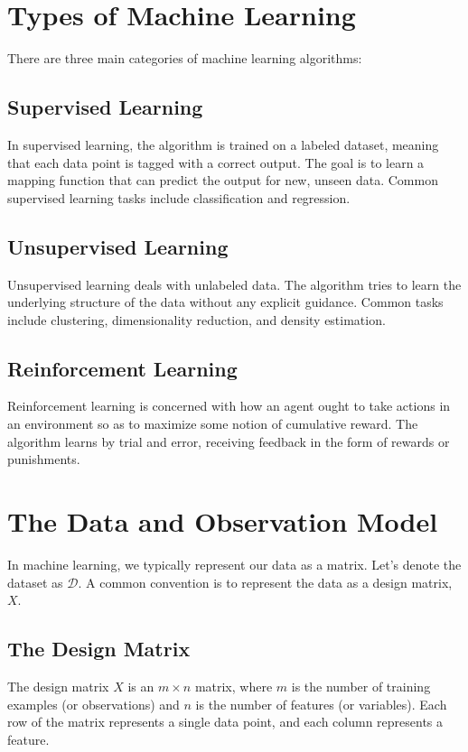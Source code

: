 \section{Types of Machine Learning}
There are three main categories of machine learning algorithms:

\subsection{Supervised Learning}
In supervised learning, the algorithm is trained on a labeled dataset, meaning that each data point is tagged with a correct output. The goal is to learn a mapping function that can predict the output for new, unseen data. Common supervised learning tasks include classification and regression.

\subsection{Unsupervised Learning}
Unsupervised learning deals with unlabeled data. The algorithm tries to learn the underlying structure of the data without any explicit guidance. Common tasks include clustering, dimensionality reduction, and density estimation.

\subsection{Reinforcement Learning}
Reinforcement learning is concerned with how an agent ought to take actions in an environment so as to maximize some notion of cumulative reward. The algorithm learns by trial and error, receiving feedback in the form of rewards or punishments.

\section{The Data and Observation Model}
In machine learning, we typically represent our data as a matrix. Let's denote the dataset as $\mathcal{D}$. A common convention is to represent the data as a design matrix, $X$.

\subsection{The Design Matrix}
The design matrix $X$ is an $m \times n$ matrix, where $m$ is the number of training examples (or observations) and $n$ is the number of features (or variables). Each row of the matrix represents a single data point, and each column represents a feature.

